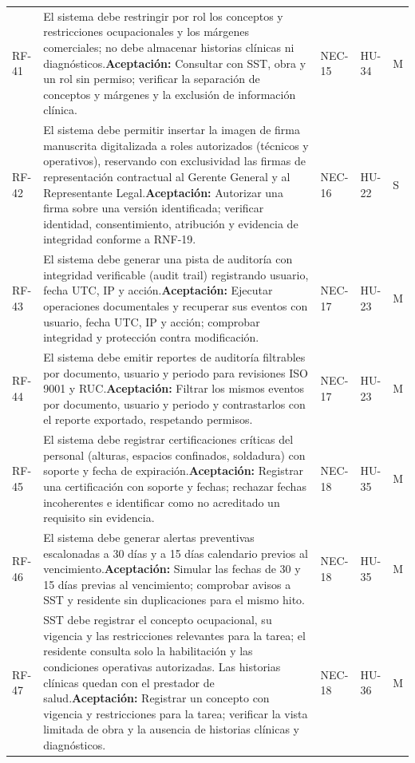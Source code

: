 \documentclass[12pt,letterpaper]{article}
\begin{document}
{\begin{longtable}{@{}L{1.6cm}L{8.05cm}L{2.0cm}L{1.5cm}L{1.2cm}@{}}
RF-41 & El sistema debe restringir por rol los conceptos y restricciones ocupacionales y los márgenes comerciales; no debe almacenar historias clínicas ni diagnósticos.\newline \textbf{Aceptación:} Consultar con SST, obra y un rol sin permiso; verificar la separación de conceptos y márgenes y la exclusión de información clínica. & NEC-15 & HU-34 & M\\
RF-42 & El sistema debe permitir insertar la imagen de firma manuscrita digitalizada a roles autorizados (técnicos y operativos), reservando con exclusividad las firmas de representación contractual al Gerente General y al Representante Legal.\newline \textbf{Aceptación:} Autorizar una firma sobre una versión identificada; verificar identidad, consentimiento, atribución y evidencia de integridad conforme a RNF-19. & NEC-16 & HU-22 & S\\
RF-43 & El sistema debe generar una pista de auditoría con integridad verificable (audit trail) registrando usuario, fecha UTC, IP y acción.\newline \textbf{Aceptación:} Ejecutar operaciones documentales y recuperar sus eventos con usuario, fecha UTC, IP y acción; comprobar integridad y protección contra modificación. & NEC-17 & HU-23 & M\\
RF-44 & El sistema debe emitir reportes de auditoría filtrables por documento, usuario y periodo para revisiones ISO 9001 y RUC.\newline \textbf{Aceptación:} Filtrar los mismos eventos por documento, usuario y periodo y contrastarlos con el reporte exportado, respetando permisos. & NEC-17 & HU-23 & M\\
RF-45 & El sistema debe registrar certificaciones críticas del personal (alturas, espacios confinados, soldadura) con soporte y fecha de expiración.\newline \textbf{Aceptación:} Registrar una certificación con soporte y fechas; rechazar fechas incoherentes e identificar como no acreditado un requisito sin evidencia. & NEC-18 & HU-35 & M\\
RF-46 & El sistema debe generar alertas preventivas escalonadas a 30 días y a 15 días calendario previos al vencimiento.\newline \textbf{Aceptación:} Simular las fechas de 30 y 15 días previas al vencimiento; comprobar avisos a SST y residente sin duplicaciones para el mismo hito. & NEC-18 & HU-35 & M\\
RF-47 & SST debe registrar el concepto ocupacional, su vigencia y las restricciones relevantes para la tarea; el residente consulta solo la habilitación y las condiciones operativas autorizadas. Las historias clínicas quedan con el prestador de salud.\newline \textbf{Aceptación:} Registrar un concepto con vigencia y restricciones para la tarea; verificar la vista limitada de obra y la ausencia de historias clínicas y diagnósticos. & NEC-18 & HU-36 & M\\

\end{longtable}}
\end{document}
